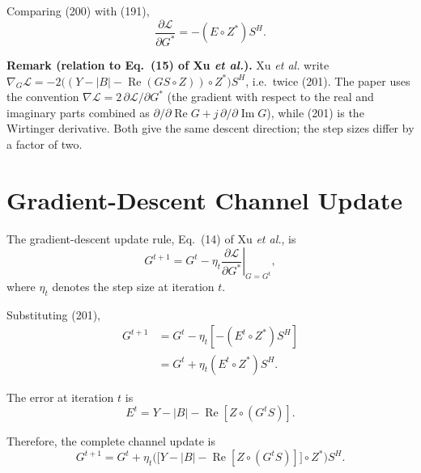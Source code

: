 \documentclass[12pt,a4paper]{article}
\begin{document}
Comparing (200) with (191),
\begin{equation}
\boxed{
\frac{\partial\mathcal L}{\partial G^*}
=
-(E\circ Z^*)S^H
}.
\tag{201}
\end{equation}

\textbf{Remark (relation to Eq.~(15) of Xu \emph{et al.}).} Xu
\emph{et al.} write
$\nabla_G\mathcal L=-2\big((Y-|B|-\operatorname{Re}(GS\circ Z))\circ
Z^*\big)S^H$, i.e.\ twice (201). The paper uses the convention
$\nabla\mathcal L=2\,\partial\mathcal L/\partial G^*$ (the gradient
with respect to the real and imaginary parts combined as
$\partial/\partial\operatorname{Re}G+j\,\partial/\partial\operatorname{Im}G$),
while (201) is the Wirtinger derivative. Both give the same descent
direction; the step sizes differ by a factor of two.

\section{Gradient-Descent Channel Update}

The gradient-descent update rule, Eq.~(14) of Xu \emph{et al.}, is
\begin{equation}
\boxed{
G^{t+1}
=
G^{t}
-
\eta_t
\left.
\frac{\partial\mathcal L}{\partial G^*}
\right|_{G=G^{t}}
},
\tag{202}
\end{equation}
where $\eta_t$ denotes the step size at iteration $t$.

Substituting (201),
\begin{equation}
\begin{aligned}
G^{t+1}
&=
G^{t}
-
\eta_t
\left[
-(E^{t}\circ Z^*)S^H
\right]\\
&=
G^{t}
+
\eta_t
(E^{t}\circ Z^*)S^H.
\end{aligned}
\tag{203}
\end{equation}

The error at iteration $t$ is
\begin{equation}
\boxed{
E^{t}
=
Y
-
|B|
-
\operatorname{Re}[Z\circ(G^{t}S)]
}.
\tag{204}
\end{equation}

Therefore, the complete channel update is
\begin{equation}
\boxed{
G^{t+1}
=
G^{t}
+
\eta_t
\Big(
\big[
Y-|B|-\operatorname{Re}[Z\circ(G^{t}S)]
\big]
\circ Z^*
\Big)
S^H
}.
\tag{205}
\end{equation}
\end{document}

